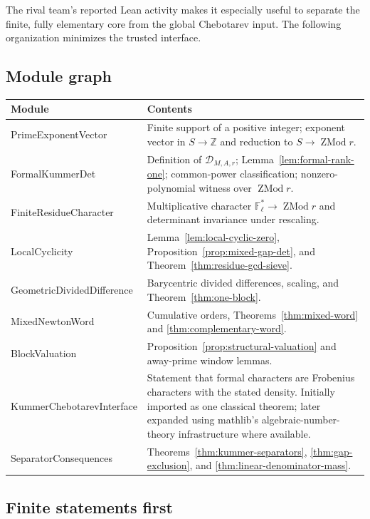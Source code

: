 \documentclass[11pt,oneside]{article}
\theoremstyle{definition}
\theoremstyle{remark}
\newcommand{\Z}{\mathbb Z}
\newcommand{\F}{\mathbb F}
\begin{document}
The rival team's reported Lean activity makes it especially useful to separate the finite,
fully elementary core from the global Chebotarev input.  The following organization minimizes
the trusted interface.

\subsection{Module graph}

\begin{center}
\small
\begin{tabularx}{0.98\textwidth}{>{\ttfamily\raggedright\arraybackslash}p{}X}
\toprule
\textnormal{Module} & \textnormal{Contents} \\
\midrule
PrimeExponentVector & Finite support of a positive integer; exponent vector in
$S\to\Z$ and reduction to $S\to\operatorname{ZMod}r$. \\
FormalKummerDet & Definition of $\mathscr D_{M,A,r}$; Lemma~\ref{lem:formal-rank-one};
common-power classification; nonzero-polynomial witness over $\operatorname{ZMod}r$. \\
FiniteResidueCharacter & Multiplicative character
$\F_\ell^*\to\operatorname{ZMod}r$ and determinant invariance under rescaling. \\
LocalCyclicity & Lemma~\ref{lem:local-cyclic-zero}, Proposition~\ref{prop:mixed-gap-det},
and Theorem~\ref{thm:residue-gcd-sieve}. \\
GeometricDividedDifference & Barycentric divided differences, scaling, and
Theorem~\ref{thm:one-block}. \\
MixedNewtonWord & Cumulative orders, Theorems~\ref{thm:mixed-word} and
\ref{thm:complementary-word}. \\
BlockValuation & Proposition~\ref{prop:structural-valuation} and away-prime window lemmas. \\
KummerChebotarevInterface & Statement that formal characters are Frobenius characters with
the stated density.  Initially imported as one classical theorem; later expanded using
mathlib's algebraic-number-theory infrastructure where available. \\
SeparatorConsequences & Theorems~\ref{thm:kummer-separators},
\ref{thm:gap-exclusion}, and \ref{thm:linear-denominator-mass}. \\
\bottomrule
\end{tabularx}
\end{center}

\subsection{Finite statements first}
\end{document}
